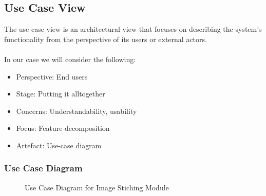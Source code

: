 \subsection{Use Case View\label{subSection::UserCaseView}} 
The use case view is an architectural view that focuses on describing the system's functionality from the perspective of its users or external actors.\\\\
     In our case we will consider the following:
     \begin{itemize}
         \item Perspective: End users
         \item Stage: Putting it alltogether
         \item Concerns: Understandability, usability
         \item Focus: Feature decomposition
         \item Artefact: Use-case diagram
     \end{itemize}

\subsubsection{Use Case Diagram\label{subsubSection::UseCaseDiag}}
\begin{figure}[H]
     \centering
     \caption{\label{Figure::UseCaseDiagram
} Use Case Diagram for Image Stiching Module \cite{lucidchart}}
\end{figure}

